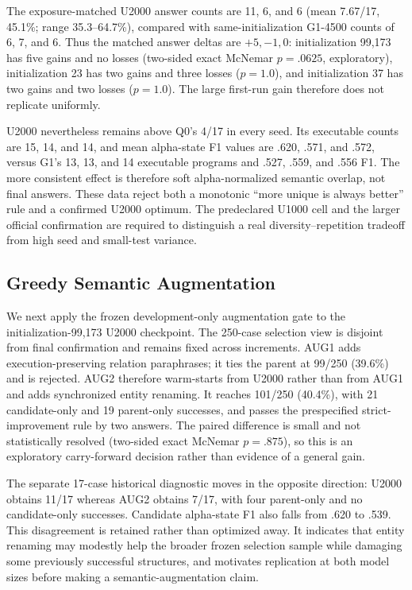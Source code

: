 \documentclass[11pt]{article}
\begin{document}
The exposure-matched U2000 answer counts are 11, 6, and 6 (mean 7.67/17,
45.1\%; range 35.3--64.7\%), compared with same-initialization G1-4500 counts
of 6, 7, and 6. Thus the matched answer deltas are $+5,-1,0$: initialization
99,173 has five gains and no losses (two-sided exact McNemar $p=.0625$,
exploratory), initialization 23 has two gains and three losses ($p=1.0$), and
initialization 37 has two gains and two losses ($p=1.0$). The large first-run
gain therefore does not replicate uniformly.

U2000 nevertheless remains above Q0's 4/17 in every seed. Its executable counts
are 15, 14, and 14, and mean alpha-state F1 values are .620, .571, and .572,
versus G1's 13, 13, and 14 executable programs and .527, .559, and .556 F1.
The more consistent effect is therefore soft alpha-normalized semantic overlap,
not final answers. These data reject both a monotonic ``more unique is always
better'' rule and a confirmed U2000 optimum. The predeclared U1000 cell and the
larger official confirmation are required to distinguish a real
diversity--repetition tradeoff from high seed and small-test variance.

\subsection{Greedy Semantic Augmentation}

We next apply the frozen development-only augmentation gate to the
initialization-99,173 U2000 checkpoint. The 250-case selection view is disjoint
from final confirmation and remains fixed across increments. AUG1 adds
execution-preserving relation paraphrases; it ties the parent at 99/250
(39.6\%) and is rejected. AUG2 therefore warm-starts from U2000 rather than
from AUG1 and adds synchronized entity renaming. It reaches 101/250 (40.4\%),
with 21 candidate-only and 19 parent-only successes, and passes the prespecified
strict-improvement rule by two answers. The paired difference is small and not
statistically resolved (two-sided exact McNemar $p=.875$), so this is an
exploratory carry-forward decision rather than evidence of a general gain.

The separate 17-case historical diagnostic moves in the opposite direction:
U2000 obtains 11/17 whereas AUG2 obtains 7/17, with four parent-only and no
candidate-only successes. Candidate alpha-state F1 also falls from .620 to
.539. This disagreement is retained rather than optimized away. It indicates
that entity renaming may modestly help the broader frozen selection sample while
damaging some previously successful structures, and motivates replication at
both model sizes before making a semantic-augmentation claim.
\end{document}
